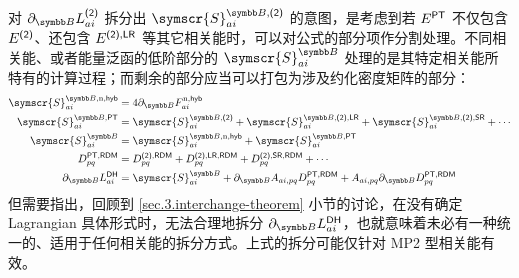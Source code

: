 对 $\partial_\mathbb{B} L_{ai}^\textmt{(2)}$ 拆分出 $\symscr{S}_{ai}^{\mathbb{B}, \textmt{(2)}}$ 的意图，是考虑到若 $E^{\textsf{PT}}$ 不仅包含 $E^{\textsf{(2)}}$、还包含 $E^{\textsf{(2)}, \textsf{LR}}$ 等其它相关能时，可以对公式的部分项作分割处理。不同相关能、或者能量泛函的低阶部分的 $\symscr{S}_{ai}^{\mathbb{B}}$ 处理的是其特定相关能所特有的计算过程；而剩余的部分应当可以打包为涉及约化密度矩阵的部分：
\begin{align}
    \symscr{S}_{ai}^{\mathbb{B}, \mathrm{n}, \textmt{hyb}} &= 4 \partial_\mathbb{B} F_{ai}^{\mathrm{n}, \textmt{hyb}} \\
    \symscr{S}_{ai}^{\mathbb{B}, \textmt{PT}} &= \symscr{S}_{ai}^{\mathbb{B}, \textmt{(2)}} + \symscr{S}_{ai}^{\mathbb{B}, \textmt{(2)}, \textmt{LR}} + \symscr{S}_{ai}^{\mathbb{B}, \textmt{(2)}, \textmt{SR}} + \cdots \notag\\
    \symscr{S}_{ai}^{\mathbb{B}} &= \symscr{S}_{ai}^{\mathbb{B}, \mathrm{n}, \textmt{hyb}} + \symscr{S}_{ai}^{\mathbb{B}, \textmt{PT}} \\
    \label{eq.3.pt-rdm}
    D_{pq}^{\textmt{PT}, \textmt{RDM}} &= D_{pq}^{\textmt{(2)}, \textmt{RDM}} + D_{pq}^{\textmt{(2)}, \textmt{LR}, \textmt{RDM}} + D_{pq}^{\textmt{(2)}, \textmt{SR}, \textmt{RDM}} + \cdots\\
    \label{eq.3.Lai-by-SCR3}
    \partial_\mathbb{B} L_{ai}^\textmt{DH} &= \symscr{S}_{ai}^{\mathbb{B}} + \partial_\mathbb{B} A_{ai, pq} D_{pq}^{\textmt{PT}, \textmt{RDM}} + A_{ai, pq} \partial_\mathbb{B} D_{pq}^{\textmt{PT}, \textmt{RDM}}
\end{align}
但需要指出，回顾到 \ref{sec.3.interchange-theorem} 小节的讨论，在没有确定 Lagrangian 具体形式时，无法合理地拆分 $\partial_\mathbb{B} L_{ai}^\textmt{DH}$，也就意味着未必有一种统一的、适用于任何相关能的拆分方式。上式的拆分可能仅针对 MP2 型相关能有效。

